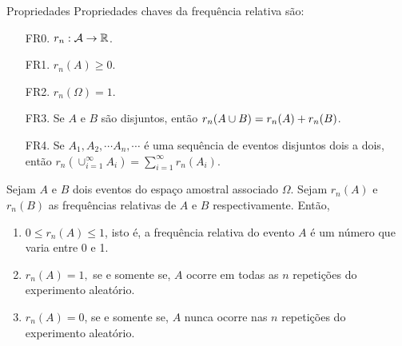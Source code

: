 %
\begin{frame}
\begin{block}{Propriedades}
%
%
Propriedades chaves da frequência relativa são:
\begin{enumerate}
\item[FR0.] $r_n:{\cal A}\rightarrow\mathbb{R}$.
\item[FR1.] $r_n(A)\geq 0$.
\item[FR2.] $r_n(\Omega)=1$.
\item[FR3.] Se $A$ e $B$ são disjuntos, então $r_n(A\cup
B)=r_n(A)+r_n(B)$.
\item[FR4.] Se $A_{1}, A_{2}, \cdots A_{n}, \cdots $ \'e uma sequ\^encia
de eventos disjuntos dois a dois, ent\~ao
$r_{n}(\cup_{i=1}^{\infty}A_{i})= \sum_{i=1}^{\infty}r_{n}(A_{i}).$
\end{enumerate}

\end{block}
\bigskip
Sejam $A$ e $B$ dois eventos do espaço amostral associado $\Omega$. Sejam $r_n(A)$   e $r_n(B)$ as frequências relativas de $A$ e $B$ respectivamente. Então, 
\begin{enumerate}
\item $ 0 \leq r_n(A) \leq 1$, isto é, a frequência relativa do evento $A$ é um número que varia entre 0 e 1. 
\item  $r_n(A)=1,$  se e somente se, $A$ ocorre em todas as $n$ repetições do experimento aleatório. 
\item  $r_n(A)=0$, se e somente se, $A$ nunca ocorre nas $n$ repetições do experimento aleatório. 
\end{enumerate}


\end{frame}
%
